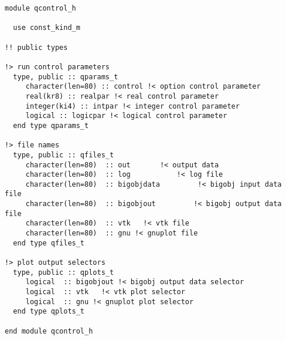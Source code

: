 \small
\begin{verbatim}
module qcontrol_h

  use const_kind_m

!! public types

!> run control parameters
  type, public :: qparams_t
     character(len=80) :: control !< option control parameter
     real(kr8) :: realpar !< real control parameter
     integer(ki4) :: intpar !< integer control parameter
     logical :: logicpar !< logical control parameter
  end type qparams_t

!> file names
  type, public :: qfiles_t
     character(len=80)  :: out       !< output data
     character(len=80)  :: log           !< log file
     character(len=80)  :: bigobjdata         !< bigobj input data file
     character(len=80)  :: bigobjout         !< bigobj output data file
     character(len=80)  :: vtk   !< vtk file
     character(len=80)  :: gnu !< gnuplot file
  end type qfiles_t

!> plot output selectors
  type, public :: qplots_t
     logical  :: bigobjout !< bigobj output data selector
     logical  :: vtk   !< vtk plot selector
     logical  :: gnu !< gnuplot plot selector
  end type qplots_t

end module qcontrol_h
\end{verbatim}
\normalsize
